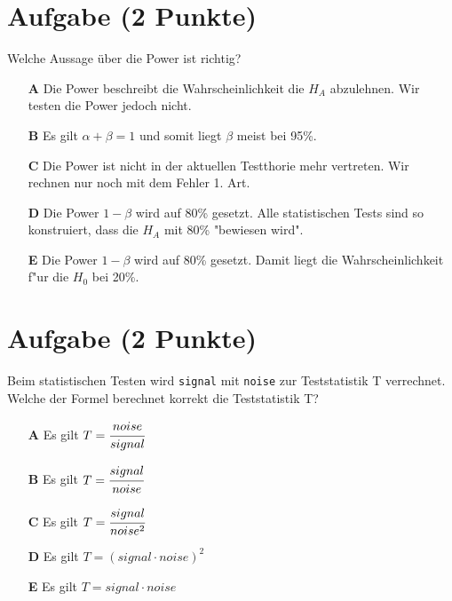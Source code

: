 \documentclass[a4paper, 9pt]{scrartcl}\usepackage[]{graphicx}\usepackage[]{xcolor}
\begin{document}
\section{Aufgabe \hfill (2 Punkte)}

Welche Aussage {\"u}ber die Power ist richtig?



\begin{enumerate}
\item [\textbf{A} \msquare] Die Power beschreibt die Wahrscheinlichkeit die $H_A$ abzulehnen. Wir testen die Power jedoch nicht.
\item [\textbf{B} \msquare] Es gilt $\alpha + \beta = 1$ und somit liegt $\beta$ meist bei 95\%.
\item [\textbf{C} \msquare] Die Power ist nicht in der aktuellen Testthorie mehr vertreten. Wir rechnen nur noch mit dem Fehler 1. Art.
\item [\textbf{D} \msquare] Die Power $1-\beta$ wird auf 80\% gesetzt. Alle statistischen Tests sind so konstruiert, dass die $H_A$ mit 80\% "bewiesen wird".
\item [\textbf{E} \msquare] Die Power $1-\beta$ wird auf 80\% gesetzt. Damit liegt die Wahrscheinlichkeit f{"u}r die $H_0$ bei 20\%.
\end{enumerate}

\section{Aufgabe \hfill (2 Punkte)}

Beim statistischen Testen wird \texttt{signal} mit \texttt{noise} zur
Teststatistik T verrechnet. Welche der Formel berechnet korrekt die
Teststatistik T?



\begin{enumerate}
\item [\textbf{A} \msquare] Es gilt $T = \cfrac{noise}{signal}$
\item [\textbf{B} \msquare] Es gilt $T = \cfrac{signal}{noise}$
\item [\textbf{C} \msquare] Es gilt $T = \cfrac{signal}{noise^2}$
\item [\textbf{D} \msquare] Es gilt $T = (signal \cdot noise)^2$
\item [\textbf{E} \msquare] Es gilt $T = signal \cdot noise$
\end{enumerate}

\end{document}
